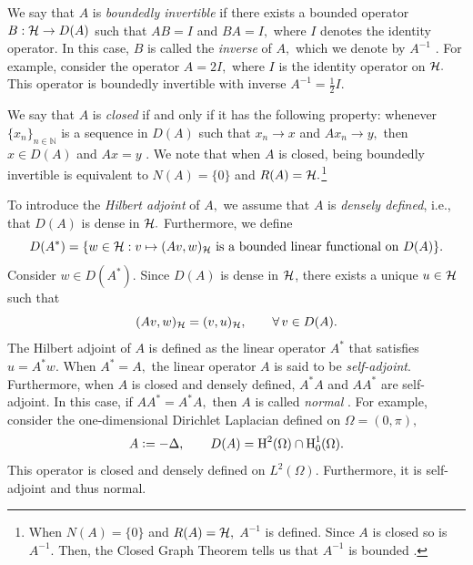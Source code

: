 We say that $A$ is \textit{boundedly invertible} if there exists a bounded operator $B:\mathcal{H} \rightarrow D(A)$ such that $AB=I$ and $BA = I,$ where $I$ denotes the identity operator. In this case, $B$ is called the \textit{inverse} of $A,$ which we denote by $A^{-1}$ \cite[Appendix~A.3]{Matt}.  For example, consider the operator $A = 2I,$ where $I$ is the identity operator on $\mathcal{H}.$ This operator is boundedly invertible with inverse $A^{-1} = \frac{1}{2} I.$ 


We say that $A$ is \textit{closed} if and only if it has the following property: whenever $\{x_n\}_{n \in \mathbb{N}}$ is a sequence in $D(A)$ such that $x_n \rightarrow x$ and $A x_n \rightarrow y,$ then $x \in D(A)$ and $Ax=y$ \cite[Theorem~4.13-3]{krey}.
We note that when $A$ is closed, being boundedly invertible is equivalent to $N(A) = \{0\}$ and $R(A) = \mathcal{H}.$\footnote{When $N(A) =\{0\}$ and $R(A) = \mathcal{H},$ $A^{-1}$ is defined. Since $A$ is closed so is $A^{-1}.$ Then, the Closed Graph Theorem tells us that $A^{-1}$ is bounded \cite[Theorem~4.13-2]{krey}.} 

 To introduce the \textit{Hilbert adjoint} of $A,$ we assume that $A$ is \textit{densely defined}, i.e., that $D(A)$ is dense in $\mathcal{H}.$ Furthermore, we define
\begin{equation}\label{D(A*)}
    D(A^*) = \{ w \in \mathcal{H} : v \mapsto ( Av, w )_{\mathcal{H}} \text{ is a bounded linear functional on } D(A)\}.
 \end{equation}
 Consider $w \in D(A^*).$ Since $D(A)$ is dense in $\mathcal{H}$, there exists a unique $u \in \mathcal{H}$ such that 
 \begin{equation}
     (Av, w)_{\mathcal{H}} = (v, u)_{\mathcal{H}}, \qquad \operatorname{\forall} v \in D(A).
 \end{equation}
 The Hilbert adjoint of $A$ is defined as the linear operator $A^*$ that satisfies $u = A^*w.$ When $A^* = A,$ the linear operator $A$ is said to be \textit{self-adjoint}. Furthermore, when $A$ is closed and densely defined, $A^*A$ and $AA^*$ are self-adjoint. In this case, if $AA^* = A^*A,$ then $A$ is called \textit{normal} \cite[Appendix~A.3]{Matt}. For example, consider the one-dimensional Dirichlet Laplacian defined on $\Omega = (0, \pi),$
 \begin{equation}
     A \vcentcolon= - \Delta, \qquad D(A) = \text{H}^2(\Omega) \cap \text{H}_0^1(\Omega).
 \end{equation}
 This operator is closed and densely defined on $L^2(\Omega).$ Furthermore, it is self-adjoint and thus normal. 

